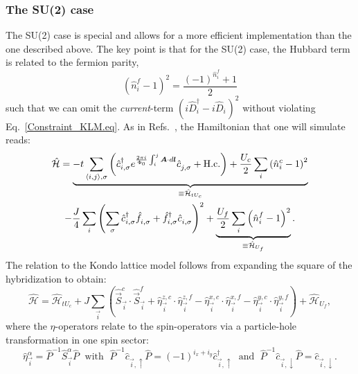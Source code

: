 \subsubsection*{The SU(2) case} 
The SU(2) case is special and allows for a more efficient implementation than the one described above.  The  key point is that  for the SU(2) case, the  Hubbard term is  related to  the fermion parity,
\begin{equation} 
   \left(   \hat{n}^f_i - 1 \right)^2    = \frac{  (-1)^{\hat{n}^f_i}  +1 }{2}
\end{equation}
such that we can omit the \textit{current}-term  $ \left(  i\hat{D}^{\dagger}_{i}  - i  \hat{D}^{\phantom\dagger}_{i}    \right)^2 $    without violating  Eq.~\eqref{Constraint_KLM.eq}.  
As in Refs.~\cite{Assaad99a,Capponi00,Beach04}, the Hamiltonian that one will simulate reads: 
 \begin{multline}
 \label{eqn:ham_kondo}
 	\hat{\mathcal{H}}  =
	\underbrace{-t \sum_{\langle i,j \rangle,\sigma} \left( \hat{c}_{i,\sigma}^{\dagger} e^{\frac{2\pi i}{\Phi_0}  \int_{i}^{j} \ve{A}\cdot d \ve{l}} \hat{c}_{j,\sigma}^{\phantom\dagger}   + \text{H.c.} \right) +
	  \frac{U_c}{2}   \sum_{i}   \left( \hat{n}^{c}_{i} -1 \right)^2    }_{\equiv \hat{\mathcal{H}}_{tU_c}}  \\
  - \frac{J}{4} 	\sum_{i} \left( \sum_{\sigma} \hat{c}_{i,\sigma}^{\dagger}  \hat{f}_{i,\sigma}^{\phantom\dagger}  + 
	                                                        \hat{f}_{i,\sigma}^{\dagger}  \hat{c}_{i,\sigma}^{\phantom\dagger}   \right)^{2}   +
        \underbrace{\frac{U_f}{2}   \sum_{i}   \left( \hat{n}^{f}_{i} -1 \right)^2}_{\equiv \hat{\mathcal{H}}_{U_f}}.
 \end{multline}
The  relation to the Kondo lattice model follows  from expanding the square  of the hybridization to obtain: 
 \begin{equation}
 	\hat{\mathcal{H}}  =\hat{\mathcal{H}}_{tU_c}   
	+ J \sum_{\vec{i}}  \left(  \hat{\vec{S}}^{c}_{\vec{i}} \cdot  \hat{\vec{S}}^{f}_{\vec{i}}    +   \hat{\eta}^{z,c}_{\vec{i}} \cdot  \hat{\eta}^{z,f}_{\vec{i}}  
		-  \hat{\eta}^{x,c}_{\vec{i}} \cdot  \hat{\eta}^{x,f}_{\vec{i}}  -  \hat{\eta}^{y,c}_{\vec{i}} \cdot  \hat{\eta}^{y,f}_{\vec{i}} \right) 
	 + \hat{\mathcal{H}}_{U_f},
 \end{equation}
 where the $\eta$-operators  relate to the spin-operators via a particle-hole transformation in one spin sector: 
 \begin{equation} 
 	\hat{\eta}^{\alpha}_{\vec{i}}  = \hat{P}^{-1}  \hat{S}^{\alpha}_{\vec{i}} \hat{P}  	\; \text{ with }  \;   
	\hat{P}^{-1}  \hat{c}^{\phantom\dagger}_{\vec{i},\uparrow} \hat{P}  =   (-1)^{i_x+i_y} \hat{c}^{\dagger}_{\vec{i},\uparrow}  \; \text{ and }  \;   
	\hat{P}^{-1}  \hat{c}^{\phantom\dagger}_{\vec{i},\downarrow} \hat{P}  = \hat{c}^{\phantom\dagger}_{\vec{i},\downarrow} .
 \end{equation}
